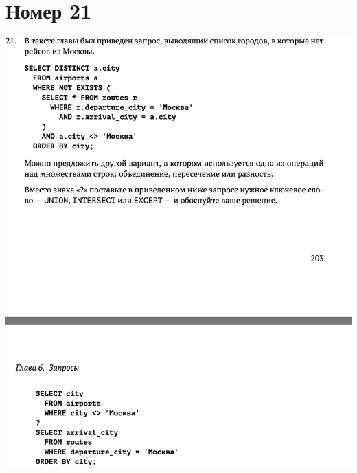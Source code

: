 \documentclass[a4paper,12pt]{article}
\begin{document}
\section*{Номер 21}
\includegraphics[scale=0.6]{t21.png}
\\\\
\\\\
\end{document}
